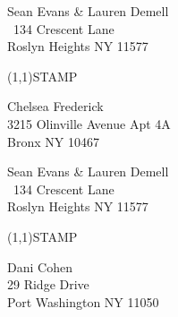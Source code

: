 \documentclass[12pt]{article}
\begin{document}
\begin{minipage}{.5\linewidth} \noindent
Sean Evans \& Lauren Demell\\\ 
134 Crescent Lane\\ 
Roslyn Heights NY 11577
\end{minipage}
\begin{minipage}{.5\linewidth \hspace{-.2in} \vspace{-.3in}}
\begin{flushright}
\framebox(1,1){STAMP}
\end{flushright}
\end{minipage}

\begin{center} \begin{Huge} \vspace*{\fill}
Chelsea Frederick\\
3215 Olinville Avenue Apt 4A\\
Bronx NY 10467\\
\vspace{\fill} \end{Huge} \end{center}

\clearpage

\begin{minipage}{.5\linewidth} \noindent
Sean Evans \& Lauren Demell\\\ 
134 Crescent Lane\\ 
Roslyn Heights NY 11577
\end{minipage}
\begin{minipage}{.5\linewidth \hspace{-.2in} \vspace{-.3in}}
\begin{flushright}
\framebox(1,1){STAMP}
\end{flushright}
\end{minipage}

\begin{center} \begin{Huge} \vspace*{\fill}
Dani Cohen\\
29 Ridge Drive\\
Port Washington NY 11050\\
\vspace{\fill} \end{Huge} \end{center}

\clearpage
\end{document}
